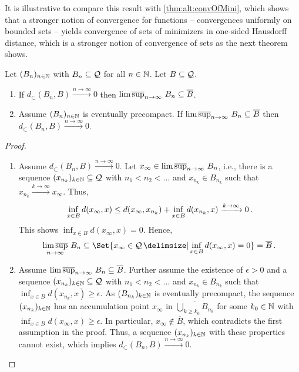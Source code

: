 %
It is illustrative to compare this result with \autoref{thm:alt:convOfMini}, which shows that a stronger notion of convergence for functions -- convergences uniformly on bounded sets -- yields convergence of sets of minimizers in one-sided Hausdorff distance, which is a stronger notion of convergence of sets as the next theorem shows.
%
\begin{theorem}\label{thm:outerVsHaus}
	Let $(B_n)_{n\in\mathbb{N}}$ with $B_n \subseteq \mathcal{Q}$ for all $n\in\mathbb{N}$. Let $B \subseteq \mathcal{Q}$.
	\begin{enumerate}[label=(\roman*)]
		\item If $d_{\subset}(B_n, B) \xrightarrow{n\to\infty} 0$ then $\operatorname*{lim\, \overline{sup}}_{n\to\infty}\, B_n \subseteq \overline{B}$.
		\item Assume $(B_n)_{n\in\mathbb{N}}$ is eventually precompact. If $\operatorname*{lim\, \overline{sup}}_{n\to\infty}\, B_n \subseteq \overline{B}$ then $d_{\subset}(B_n, B) \xrightarrow{n\to\infty} 0$.
	\end{enumerate}	
\end{theorem}
%
%
\begin{proof}
	\mbox{ }
	\begin{enumerate}[label=(\roman*)]
\item 
	Assume $d_{\subset}(B_n, B) \xrightarrow{n\to\infty} 0$. Let $x_\infty \in \operatorname*{lim\, \overline{sup}}_{n\to\infty}\, B_n$, i.e., there is a sequence $(x_{n_k})_{k\in\mathbb{N}}\subseteq \mathcal{Q}$ with $n_1 < n_2 < \dots$ and $x_{n_k}\in B_{n_k}$ such that $x_{n_k} \xrightarrow{k\to\infty} x_\infty$. Thus, 
	\begin{equation*}
		\inf_{x\in B} d(x_\infty, x) \leq d(x_\infty, x_{n_k}) + \inf_{x\in B} d(x_{n_k}, x)  \xrightarrow{k\to\infty} 0\, .
	\end{equation*}
	This shows $\inf_{x\in B} d(x_\infty, x) = 0$. Hence,
	\begin{equation*}
		\outerlim_{n\to\infty}\,B_n \subset \Set{x_\infty \in \MS \given \inf_{x\in B} d(x_\infty, x) = 0} = \overline{B}\eqfs
	\end{equation*}
\item	
	Assume  $\operatorname*{lim\, \overline{sup}}_{n\to\infty}\, B_n \subseteq \overline{B}$. Further assume the existence of $\epsilon>0$ and a sequence $(x_{n_k})_{k\in\mathbb{N}}\subseteq \mathcal{Q}$ with $n_1 < n_2 < \dots$ and $x_{n_k}\in B_{n_k}$ such that $\inf_{x\in B} d(x_{n_k}, x) \geq \epsilon$. As $(B_{n_k})_{k\in\mathbb{N}}$ is eventually precompact, the sequence $(x_{n_k})_{k\in\mathbb{N}}$ has an accumulation point $x_\infty$ in $\overline{\bigcup_{k \geq k_0} B_{n_k}}$ for some $k_0\in\mathbb{N}$ with $\inf_{x\in B} d(x_{\infty}, x) \geq \epsilon$. In particular, $x_{\infty} \not\in \overline{B}$, which contradicts the first assumption in the proof. Thus, a sequence $(x_{n_k})_{k\in\mathbb{N}}$ with these properties cannot exist, which implies $d_{\subset}(B_n, B) \xrightarrow{n\to\infty} 0$.
	\end{enumerate}
\end{proof}
